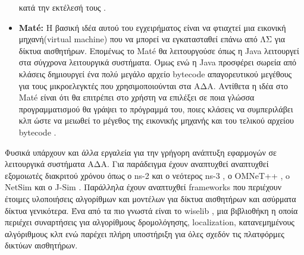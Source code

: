 \begin{itemize}
κατά την εκτέλεσή τους \cite{nano-rk}.
\item \textbf{Mat\'e:} Η βασική ιδέα αυτού του εγχειρήματος είναι να φτιαχτεί μια εικονική μηχανή(virtual machine) που να μπορεί να εγκατασταθεί επάνω από ΛΣ για
δίκτυα αισθητήρων.
Επομένως το Mat\'e θα λειτουργούσε όπως η Java λειτουργεί στα σύγχρονα λειτουργικά συστήματα.
Όμως ενώ η Java προσφέρει σωρεία από κλάσεις δημιουργεί ένα πολύ μεγάλο αρχείο bytecode απαγορευτικού μεγέθους για τους μικροελεγκτές που χρησιμοποιούνται στα ΑΔΑ.
Αντίθετα η ιδέα στο Mat\'e είναι ότι θα επιτρέπει στο χρήστη να επιλέξει σε ποια γλώσσα προγραμματισμού θα γράψει το
πρόγραμμά του, ποιες κλάσεις να συμπεριλάβει κλπ ώστε να μειωθεί το μέγεθος της εικονικής μηχανής και του τελικού αρχείου bytecode \cite{mate}.
\end{itemize}

Φυσικά υπάρχουν και άλλα εργαλεία για την γρήγορη ανάπτυξη εφαρμογών σε λειτουργικά συστήματα ΑΔΑ.
Για παράδειγμα έχουν αναπτυχθεί αναπτυχθεί εξομοιωτές διακριτού χρόνου όπως ο ns-2 \cite{ns-2} και ο νεότερος ns-3 \cite{ns-3}, ο OMNeT++ \cite{omnet}, o NetSim
\cite{netsim} και ο J-Sim \cite{j-sim}.
Παράλληλα έχουν αναπτυχθεί frameworks που περιέχουν έτοιμες υλοποιήσεις αλγορίθμων και μοντέλων για δίκτυα αισθητήρων και ασύρματα δίκτυα γενικότερα.
Ένα από τα πιο γνωστά είναι το wiselib \cite{wiselib}, μια βιβλιοθήκη η οποία περιέχει συναρτήσεις για αλγορίθμους δρομολόγησης, localization, κατανεμημένους
αλγόριθμους κλπ ενώ παρέχει πλήρη υποστήριξη για όλες σχεδόν τις πλατφόρμες δικτύων αισθητήρων.


